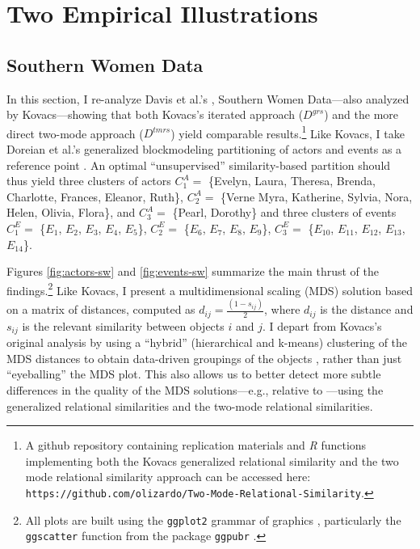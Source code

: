 \documentclass[a4paper,fleqn]{cas-sc}
\begin{document}
\section{Two Empirical Illustrations}
\subsection{Southern Women Data}
In this section, I re-analyze Davis et al.'s \citeyearpar{davis1941}, Southern Women Data---also analyzed by Kovacs---showing that both Kovacs's iterated approach ($D^{grs}$) and the more direct two-mode approach ($D^{tmrs}$) yield comparable results.\footnote{A github repository containing replication materials and \textit{R} functions implementing both the Kovacs generalized relational similarity and the two mode relational similarity approach can be accessed here: \texttt{https://github.com/olizardo/Two-Mode-Relational-Similarity}.} Like Kovacs, I take Doreian et al.'s generalized blockmodeling partitioning of actors and events as a reference point \citeyearpar[Table 4]{doreian2004}. An optimal ``unsupervised'' similarity-based partition should thus yield three clusters of actors $C_1^A =$ \{Evelyn, Laura, Theresa, Brenda, Charlotte, Frances, Eleanor, Ruth\}, $C_2^A=$ \{Verne Myra, Katherine, Sylvia, Nora, Helen, Olivia, Flora\}, and $C_3^A=$ \{Pearl, Dorothy\} and three clusters of events $C_1^E=$ \{$E_1$, $E_2$, $E_3$, $E_4$, $E_5$\}, $C_2^E=$ \{$E_6$, $E_7$, $E_8$, $E_9$\}, $C_3^E=$ \{$E_{10}$, $E_{11}$, $E_{12}$, $E_{13}$, $E_{14}$\}. 

Figures \ref{fig:actors-sw} and \ref{fig:events-sw} summarize the main thrust of the findings.\footnote{All plots are built using the \texttt{ggplot2} grammar of graphics \citep{wickham16}, particularly the \texttt{ggscatter} function from the package \texttt{ggpubr} \citep{kassambara}.} Like Kovacs, I present a multidimensional scaling (MDS) solution based on a matrix of distances, computed as $d_{ij} = \frac{(1-s_{ij})}{2}$, where $d_{ij}$ is the distance and $s_{ij}$ is the relevant similarity between objects $i$ and $j$. I depart from Kovacs's original analysis by using a ``hybrid'' (hierarchical and k-means) clustering of the MDS distances to obtain data-driven groupings of the objects \citep{chen2005novel}, rather than just ``eyeballing'' the MDS plot. This also allows us to better detect more subtle differences in the quality of the MDS solutions---e.g., relative to \citet{doreian2004}---using the generalized relational similarities and the two-mode relational similarities. 
\end{document}

